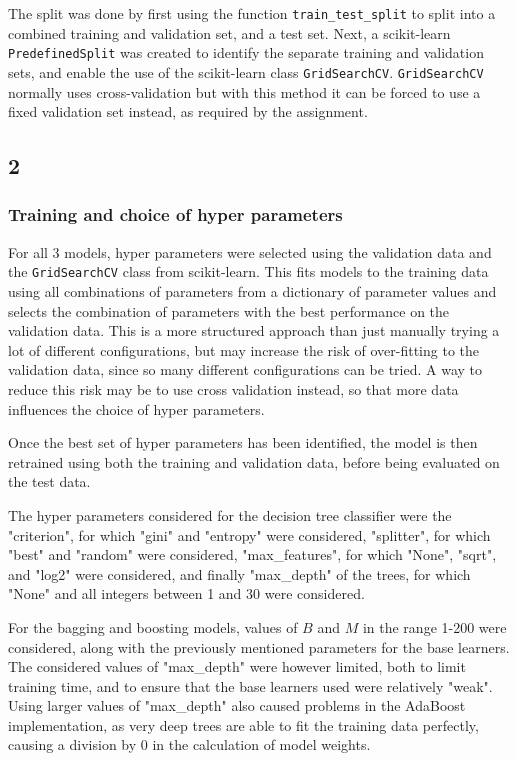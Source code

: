 \documentclass[a4paper, 12pt]{article}
\begin{document}
The split was done by first using the function \texttt{train\_test\_split} to split into a combined training and validation set, and a test set. Next, a scikit-learn \texttt{PredefinedSplit} was created to identify the separate training and validation sets, and enable the use of the scikit-learn class \texttt{GridSearchCV}. \texttt{GridSearchCV} normally uses cross-validation but with this method it can be forced to use a fixed validation set instead, as required by the assignment.


\subsection{2}

\subsubsection{Training and choice of hyper parameters}

For all 3 models, hyper parameters were selected using the validation data and the \texttt{GridSearchCV} class from scikit-learn. This fits models to the training data using all combinations of parameters from a dictionary of parameter values and selects the combination of parameters with the best performance on the validation data. This is a more structured approach than just manually trying a lot of different configurations, but may increase the risk of over-fitting to the validation data, since so many different configurations can be tried. A way to reduce this risk may be to use cross validation instead, so that more data influences the choice of hyper parameters.

Once the best set of hyper parameters has been identified, the model is then retrained using both the training and validation data, before being evaluated on the test data.

The hyper parameters considered for the decision tree classifier were the "criterion", for which "gini" and "entropy" were considered, "splitter", for which "best" and "random" were considered, "max\_features", for which "None", "sqrt", and "log2" were considered, and finally "max\_depth" of the trees, for which "None" and all integers between 1 and 30 were considered.

For the bagging and boosting models, values of $B$ and $M$ in the range 1-200 were considered, along with the previously mentioned parameters for the base learners. The considered values of "max\_depth" were however limited, both to limit training time, and to ensure that the base learners used were relatively "weak". Using larger values of "max\_depth" also caused problems in the AdaBoost implementation, as very deep trees are able to fit the training data perfectly, causing a division by 0 in the calculation of model weights.
\end{document}

